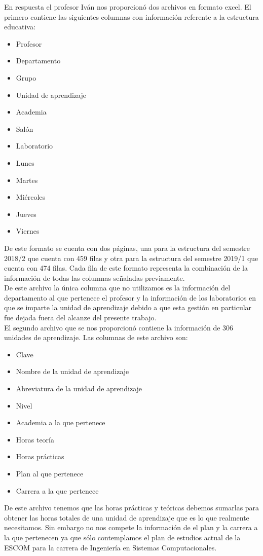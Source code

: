 En respuesta el profesor Iván nos proporcionó dos archivos en formato excel. El primero contiene las siguientes columnas con información referente a la estructura educativa:
	\begin{itemize}
		\item Profesor
		\item Departamento
		\item Grupo
		\item Unidad de aprendizaje
		\item Academia
		\item Salón
		\item Laboratorio
		\item Lunes
		\item Martes
		\item Miércoles
		\item Jueves
		\item Viernes
	\end{itemize}
De este formato se cuenta con dos páginas, una para la estructura del semestre 2018/2 que cuenta con 459 filas y otra para la estructura del semestre 2019/1 que cuenta con 474 filas. Cada fila de este formato representa la combinación de la información de todas las columnas señaladas previamente.\\

De este archivo la única columna que no utilizamos es la información del departamento al que pertenece el profesor y la información de los laboratorios en que se imparte la unidad de aprendizaje debido a que esta gestión en particular fue dejada fuera del alcanze del presente trabajo.\\

El segundo archivo que se nos proporcionó contiene la información de 306 unidades de aprendizaje. Las columnas de este archivo son:

	\begin{itemize}
		\item Clave
		\item Nombre de la unidad de aprendizaje
		\item Abreviatura de la unidad de aprendizaje
		\item Nivel
		\item Academia a la que pertenece
		\item Horas teoría
		\item Horas prácticas
		\item Plan al que pertenece
		\item Carrera a la que pertenece
	\end{itemize}

De este archivo tenemos que las horas prácticas y teóricas debemos sumarlas para obtener las horas totales de una unidad de aprendizaje que es lo que realmente necesitamos. Sin embargo no nos compete la información de el plan y la carrera a la que pertenecen ya que sólo contemplamos el plan de estudios actual de la ESCOM para la carrera de Ingeniería en Sistemas Computacionales. 